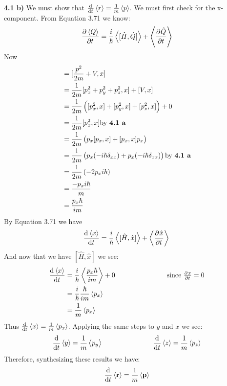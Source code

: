 \documentclass{scrartcl}
\begin{document}
\textbf{4.1 b)} We must show that $\od{}{t}\expval{r}=\frac{1}{m}\expval{p}$. We must first check for the x-component. From Equation 3.71 we know:
\begin{displaymath}
\dpd{\expval{Q}}{t}=\frac{i}{\hbar}\expval{[\hat{H},\hat{Q}]}+\expval{\dpd{\hat{Q}}{t}}
\end{displaymath}
Now
\begin{align*}
[\hat{H},\hat{x}]&=[\frac{p^2}{2m}+V,x]\\
&=\frac{1}{2m}[p_x^2+p_y^2+p_z^2,x] + [V,x]\\
&=\frac{1}{2m}\left([p_x^2,x]+[p_y^2,x]+[p_z^2,x]\right) + 0\\
&=\frac{1}{2m}[p_x^2,x] \text{\hfill by \textbf{4.1 a}}\\
&=\frac{1}{2m}\left(p_x[p_x,x]+[p_x,x]p_x\right)\\
&=\frac{1}{2m}\left(p_x(-i\hbar\delta_{xx})+p_x(-i\hbar\delta_{xx})\right) \text{\hfill by \textbf{4.1 a}}\\
&=\frac{1}{2m}\left(-2p_xi\hbar\right)\\
&=\frac{-p_xi\hbar}{m}\\
&=\frac{p_x\hbar}{im}
\end{align*}
By Equation 3.71 we have 
\begin{displaymath}
\dod{\expval{x}}{t}=\frac{i}{\hbar}\expval{[\hat{H},\hat{x}]}+\expval{\dpd{\hat{x}}{t}}\\
\end{displaymath}
And now that we have $[\hat{H},\hat{x}]$ we see:
\begin{align*}
\dod{\expval{x}}{t}&=\frac{i}{\hbar}\expval{\frac{p_x\hbar}{im}}+0 \text{\hspace{1 in} since $\pd{x}{t}=0$}\\
&=\frac{i}{\hbar}\frac{\hbar}{im}\expval{p_x}\\
&=\frac{1}{m}\expval{p_x}
\end{align*}
Thus $\od{}{t}\expval{x}=\frac{1}{m}\expval{p_x}$. Applying the same steps to $y$ and $x$ we see:
\begin{displaymath}
\dod{}{t}\expval{y}=\frac{1}{m}\expval{p_y} \text{\hspace{1 in}} \dod{}{t}\expval{z}=\frac{1}{m}\expval{p_z}
\end{displaymath}
Therefore, synthesizing these results we have:
\begin{displaymath}
\dod{}{t}\expval{\vb{r}}=\frac{1}{m}\expval{\vb{p}}
\end{displaymath}
\end{document}
